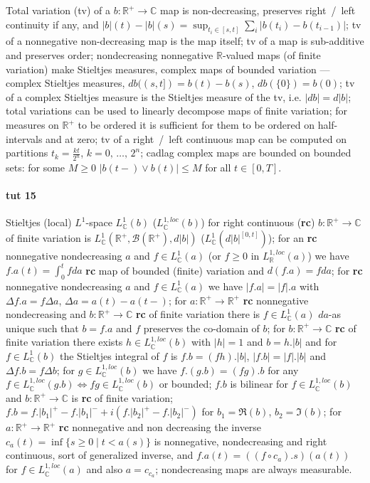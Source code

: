 \documentclass[a4paper]{article}
\newcommand{\Bcal}{\mathcal{B}}
\newcommand{\real}{\mathbb{R}}
\newcommand{\cplx}{\mathbb{C}}
\begin{document}
Total variation (tv) of a $b\colon \real^+ \to \cplx$ map is non-decreasing, preserves right~/~left continuity if any, and $|b|(t) - |b|(s) = \sup_{t_i \in [s, t]} \sum_i |b(t_i) - b(t_{i-1})|$;
tv of a nonnegative non-decreasing map is the map itself;
tv of a map is sub-additive and preserves order;
nondecreasing nonnegative $\real$-valued maps (of finite variation) make Stieltjes measures, complex maps of bounded variation --- complex Stieltjes measures, $db((s,t]) = b(t) - b(s)$, $db(\{0\}) = b(0)$;
tv of a complex Stieltjes measure is the Stieltjes measure of the tv, i.e. $|db| = d|b|$;
total variations can be used to linearly decompose maps of finite variation;
for measures on $\real^+$ to be ordered it is sufficient for them to be ordered on half-intervals and at zero;
tv of a right~/~left continuous map can be computed on partitions $t_k = \tfrac{k t}{2^n}$, $k=0,\, \ldots,\,2^n$;
cadlag complex maps are bounded on bounded sets: for some $M\geq 0$ $|b(t-) \vee b(t)| \leq M$ for all $t \in [0, T]$.



\paragraph{tut 15} %
\label{par:tut_15}

Stieltjes (local) $L^1$-space $L^1_\cplx(b)$ ($L^{1,loc}_\cplx(b)$) for right continuous
({\bf rc}) $b\colon \real^+ \to \cplx$ of finite variation is
$L_\cplx^1(\real^+, \Bcal(\real^+), d|b|)$ ($L_\cplx^1(d|b|^{[0,t]})$);
%
for an {\bf rc} nonnegative nondecreasing $a$ and $f \in L^1_\cplx(a)$ (or $f \geq 0$ in
$L^{1,loc}_\real(a)$) we have $f.a(t) = \int_0^t f da$ {\bf rc} map of bounded (finite)
variation and $d(f.a) = f da$;
%
for {\bf rc} nonnegative nondecreasing $a$ and $f \in L^1_\cplx(a)$ we have
$|f.a| = |f|.a$ with $\Delta f.a = f\Delta a$, $\Delta a = a(t) - a(t-)$;
%
for $a\colon \real^+ \to \real^+$ {\bf rc} nonnegative nondecreasing and
$b\colon \real^+ \to \cplx$ {\bf rc} of finite variation there is $f \in L^1_\cplx(a)$
$da$-as unique such that $b = f.a$ and $f$ preserves the co-domain of $b$;
%
for $b\colon \real^+ \to \cplx$ {\bf rc} of finite variation there exists
$h \in L^{1,loc}_\cplx(b)$ with $|h|=1$ and $b = h.|b|$ and for $f \in L^1_\cplx(b)$
the Stieltjes integral of $f$ is $f.b = (f h).|b|$, $|f.b| = |f|.|b|$ and
$\Delta f.b = f \Delta b$;
%
for $g \in L^{1,loc}_\cplx(b)$ we have $f.(g.b) = (fg).b$ for any
$f \in L^{1,loc}_\cplx(g.b) \Leftrightarrow fg \in L^{1,loc}_\cplx(b)$ or bounded;
%
$f.b$ is bilinear for $f \in L^{1,loc}_\cplx(b)$ and $b\colon \real^+ \to \cplx$
is {\bf rc} of finite variation;
%
$f.b = f.|b_1|^+ - f.|b_1|^- + i(f.|b_2|^+ - f.|b_2|^-)$ for $b_1 = \Re(b)$, $b_2 = \Im(b)$;
%
for $a\colon \real^+ \to \real^+$ {\bf rc} nonnegative and non decreasing the inverse
$c_a(t) = \inf\{s \geq 0 \mid t < a(s) \}$ is nonnegative, nondecreasing and right
continuous, sort of generalized inverse, and $f.a(t) = ((f \circ c_a).s)(a(t))$ for
$f \in L^{1,loc}_\cplx(a)$ and also $a = c_{c_a}$;
%
nondecreasing maps are always measurable.
\end{document}
